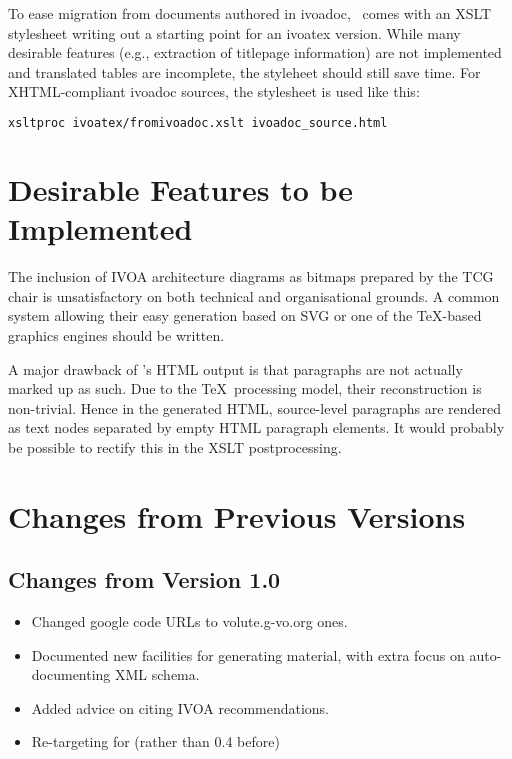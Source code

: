 \documentclass[11pt,a4paper]{ivoa}
\begin{document}
To ease migration from documents authored in ivoadoc, \ivoatex\ comes
with an XSLT stylesheet writing out a starting point for an ivoatex
version.  While many desirable features (e.g., extraction of titlepage
information) are not implemented and translated tables are incomplete,
the styleheet should still save time.  For XHTML-compliant ivoadoc
sources, the stylesheet is used like this:

\begin{lstlisting}[language=sh]
xsltproc ivoatex/fromivoadoc.xslt ivoadoc_source.html
\end{lstlisting}


\section{Desirable Features to be Implemented}

The inclusion of IVOA architecture diagrams as bitmaps prepared by the
TCG chair is unsatisfactory on both technical and organisational
grounds.  A common system allowing their easy generation based on SVG or
one of the \TeX-based graphics engines should be written.

A major drawback of \ivoatex's HTML output is that paragraphs are not actually
marked up as such.  Due to the \TeX\ processing model, their
reconstruction is non-trivial.  Hence in the generated HTML,
source-level paragraphs are rendered as text nodes separated by empty
HTML paragraph elements.  It would probably be possible to rectify this
in the XSLT postprocessing.


\appendix
\section{Changes from Previous Versions}

\subsection{Changes from Version 1.0}
\begin{itemize}
\item Changed google code URLs to volute.g-vo.org ones.
\item Documented new facilities for generating material, with extra
focus on auto-documenting XML schema.
\item Added advice on citing IVOA recommendations.
\item Re-targeting for  (rather than 0.4 before)
\end{itemize}



\end{document}
